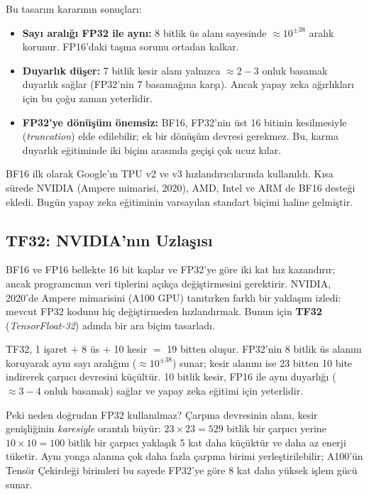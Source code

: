 Bu tasarım kararının sonuçları:
\begin{itemize}
  \item \textbf{Sayı aralığı FP32 ile aynı:} 8 bitlik üs alanı sayesinde $\approx 10^{\pm 38}$ aralık korunur. FP16'daki taşma sorunu ortadan kalkar.
  \item \textbf{Duyarlık düşer:} 7 bitlik kesir alanı yalnızca $\approx 2{-}3$ onluk basamak duyarlık sağlar (FP32'nin 7 basamağına karşı). Ancak yapay zeka ağırlıkları için bu çoğu zaman yeterlidir.
  \item \textbf{FP32'ye dönüşüm önemsiz:} BF16, FP32'nin üst 16 bitinin kesilmesiyle (\emph{truncation}) elde edilebilir; ek bir dönüşüm devresi gerekmez. Bu, karma duyarlık eğitiminde iki biçim arasında geçişi çok ucuz kılar.
\end{itemize}

BF16 ilk olarak Google'ın TPU v2 ve v3 hızlandırıcılarında kullanıldı. Kısa sürede NVIDIA (Ampere mimarisi, 2020), AMD, Intel ve ARM de BF16 desteği ekledi. Bugün yapay zeka eğitiminin varsayılan standart biçimi haline gelmiştir.

\subsection{TF32: NVIDIA'nın Uzlaşısı}

BF16 ve FP16 bellekte 16 bit kaplar ve FP32'ye göre iki kat hız kazandırır; ancak programcının veri tiplerini açıkça değiştirmesini gerektirir. NVIDIA, 2020'de Ampere mimarisini (A100 GPU) tanıtırken farklı bir yaklaşım izledi: mevcut FP32 kodunu hiç değiştirmeden hızlandırmak. Bunun için \textbf{TF32} (\emph{TensorFloat-32}) adında bir ara biçim tasarladı.

TF32, 1 işaret $+$ 8 üs $+$ 10 kesir $=$ 19 bitten oluşur. FP32'nin 8 bitlik üs alanını koruyarak aynı sayı aralığını ($\approx 10^{\pm 38}$) sunar; kesir alanını ise 23 bitten 10 bite indirerek çarpıcı devresini küçültür. 10 bitlik kesir, FP16 ile aynı duyarlığı ($\approx 3{-}4$ onluk basamak) sağlar ve yapay zeka eğitimi için yeterlidir.

Peki neden doğrudan FP32 kullanılmaz? Çarpma devresinin alanı, kesir genişliğinin \emph{karesiyle} orantılı büyür: $23 \times 23 = 529$ bitlik bir çarpıcı yerine $10 \times 10 = 100$ bitlik bir çarpıcı yaklaşık 5 kat daha küçüktür ve daha az enerji tüketir. Aynı yonga alanına çok daha fazla çarpma birimi yerleştirilebilir; A100'ün Tensör Çekirdeği birimleri bu sayede FP32'ye göre 8 kat daha yüksek işlem gücü sunar.


